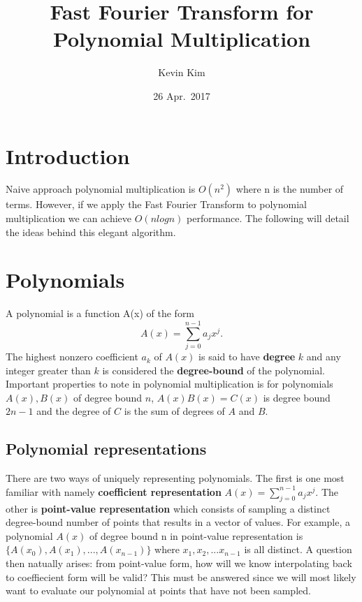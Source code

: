 \documentclass[11pt,leffttterpaper]{truthesis}
\title{Fast Fourier Transform for Polynomial Multiplication}
\author{Kevin Kim}
\date{26 Apr.\ 2017}
\theoremstyle{plain}
\begin{document}
\maketitle
\tableofcontents

\chapter{Introduction}

Naive approach polynomial multiplication is \(O(n^2)\) where n is the number of terms.
However, if we apply the Fast Fourier Transform to polynomial multiplication we can achieve
\(O(nlogn)\) performance. The following will detail the ideas behind this elegant algorithm.

\chapter{Polynomials}
A polynomial is a function A(x) of the form
\[
  A(x) = \sum_{j = 0}^{n-1}a_jx^j.
\]
The highest nonzero coefficient \(a_k\) of \(A(x)\) is said
to have \textbf{degree} \(k\) and any integer greater than \(k\)
is considered the \textbf{degree-bound} of the polynomial.
Important properties to note in polynomial multiplication is
for polynomials \(A(x), B(x)\) of degree bound $n$, \(A(x)B(x)=C(x)\)
is degree bound \(2n-1\) and the degree of \(C\) is the sum of
degrees of \(A\) and \(B\).

\section{Polynomial representations}
There are two ways of uniquely representing polynomials. The first
is one most familiar with namely \textbf{coefficient representation}
\(  A(x) = \sum_{j = 0}^{n-1}a_jx^j\). The other is \textbf{point-value
representation} which consists of sampling a distinct degree-bound number of
points that results in a vector of values. For example, a polynomial
\(A(x)\) of degree bound n in point-value representation is
\(\{A(x_0),A(x_1),...,A(x_{n-1})\}\) where \(x_1,x_2,...x_{n-1}\) is all
distinct. A question then natually arises: from point-value form, how
will we know interpolating back to coeffiecient form will be valid? This
must be answered since we will most likely want to evaluate our
polynomial at points that have not been sampled.
\end{document}

